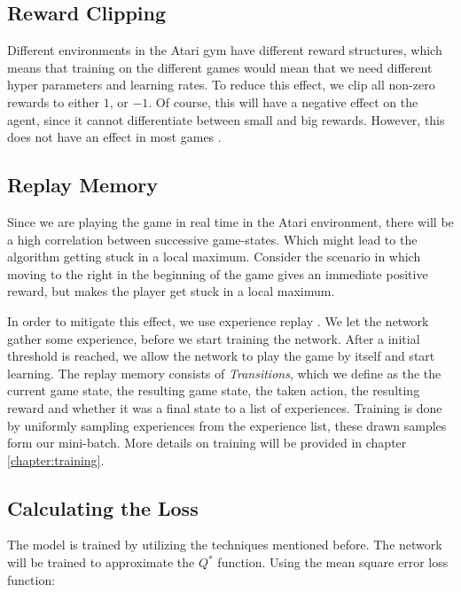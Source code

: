 \documentclass{article}
\begin{document}
\subsection{Reward Clipping}

Different environments in the Atari gym have different reward structures, which means that training on the different games would mean that we need different hyper parameters and learning rates. To reduce this effect, we clip all non-zero rewards to either $1$, or $-1$. Of course, this will have a negative effect on the agent, since it cannot differentiate between small and big rewards. However, this does not have an effect in most games \cite{mnih2015human}.


\subsection{Replay Memory}
Since we are playing the game in real time in the Atari environment, there will be a high correlation between successive game-states. Which might lead to the algorithm getting stuck in a local maximum. Consider the scenario in which moving to the right in the beginning of the game gives an immediate positive reward, but makes the player get stuck in a local maximum.

In order to mitigate this effect, we use experience replay \cite{mnih2013playing}. We let the network gather some experience, before we start training the network. After a initial threshold is reached, we allow the network to play the game by itself and start learning. The replay memory consists of \textit{Transitions}, which we define as the the current game state, the resulting game state, the taken action, the resulting reward and whether it was a final state to a list of experiences. Training is done by uniformly sampling experiences from the experience list, these drawn samples form our mini-batch. More details on training will be provided in chapter \ref{chapter:training}.

\subsection{Calculating the Loss} \label{chapter:loss}

The model is trained by utilizing the techniques mentioned before. The network will be trained to approximate the $Q^*$ function. Using the mean square error loss function:
\end{document}
